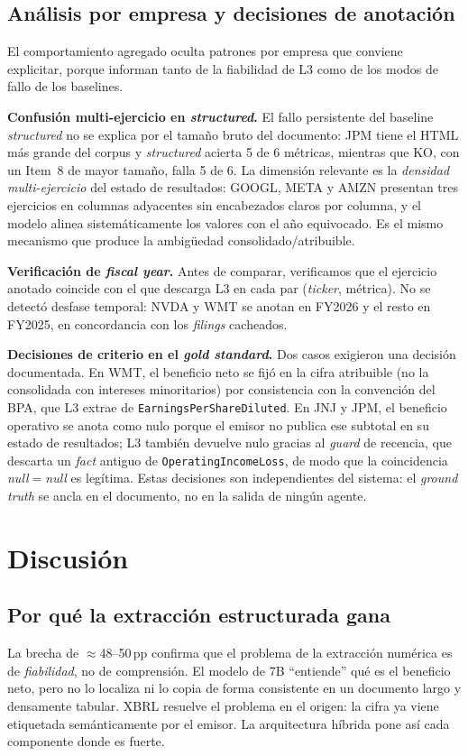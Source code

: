 \documentclass[conference]{IEEEtran}
\begin{document}
\subsection{Análisis por empresa y decisiones de anotación}
El comportamiento agregado oculta patrones por empresa que conviene explicitar,
porque informan tanto de la fiabilidad de L3 como de los modos de fallo de los
baselines.

\textbf{Confusión multi-ejercicio en \textit{structured}.} El fallo persistente
del baseline \textit{structured} no se explica por el tamaño bruto del documento:
JPM tiene el HTML más grande del corpus y \textit{structured} acierta 5 de 6
métricas, mientras que KO, con un Item~8 de mayor tamaño, falla 5 de 6. La
dimensión relevante es la \emph{densidad multi-ejercicio} del estado de
resultados: GOOGL, META y AMZN presentan tres ejercicios en columnas adyacentes
sin encabezados claros por columna, y el modelo alinea sistemáticamente los
valores con el año equivocado. Es el mismo mecanismo que produce la ambigüedad
consolidado/atribuible.

\textbf{Verificación de \textit{fiscal year}.} Antes de comparar, verificamos que
el ejercicio anotado coincide con el que descarga L3 en cada par
(\textit{ticker}, métrica). No se detectó desfase temporal: NVDA y WMT se anotan
en FY2026 y el resto en FY2025, en concordancia con los \textit{filings}
cacheados.

\textbf{Decisiones de criterio en el \textit{gold standard}.} Dos casos exigieron
una decisión documentada. En WMT, el beneficio neto se fijó en la cifra
atribuible (no la consolidada con intereses minoritarios) por consistencia con la
convención del BPA, que L3 extrae de \texttt{EarningsPerShareDiluted}. En JNJ y
JPM, el beneficio operativo se anota como nulo porque el emisor no publica ese
subtotal en su estado de resultados; L3 también devuelve nulo gracias al
\textit{guard} de recencia, que descarta un \textit{fact} antiguo de
\texttt{OperatingIncomeLoss}, de modo que la coincidencia
\textit{null}$=$\textit{null} es legítima. Estas decisiones son independientes
del sistema: el \textit{ground truth} se ancla en el documento, no en la salida
de ningún agente.

\section{Discusión}
\label{sec:discussion}
\subsection{Por qué la extracción estructurada gana}
La brecha de $\approx$48--50\,pp confirma que el problema de la extracción
numérica es de \emph{fiabilidad}, no de comprensión. El modelo de 7B
``entiende'' qué es el beneficio neto, pero no lo localiza ni lo copia de forma
consistente en un documento largo y densamente tabular. XBRL resuelve el problema
en el origen: la cifra ya viene etiquetada semánticamente por el emisor. La
arquitectura híbrida pone así cada componente donde es fuerte.
\end{document}
